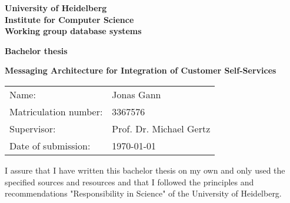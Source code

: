 \documentclass[
     12pt,         %
     a4paper,      %
     BCOR10mm,     %
     DIV14,        %
aragraph skip instad of paragraph indent
     ]{scrreprt}
\begin{document}
\listoftodos

\begin{titlepage}
     \vspace*{1cm}
     \begin{center}
          \vspace*{3cm}
          \textbf
          {
               \Large University of Heidelberg\\
               \smallskip
               \Large Institute for Computer Science\\
               \smallskip
               \Large Working group database systems\\
               \smallskip
          }

          \vspace{3cm}

          \textbf{\large Bachelor thesis}

          \vspace{0.5\baselineskip}
          {
               \huge
               \textbf{Messaging Architecture for Integration of Customer Self-Services}
          }

     \end{center}

     \vfill
     {
          \large
          \begin{tabular}[l]{ll}
               Name:                 & Jonas Gann              \\
               Matriculation number: & 3367576                 \\
               Supervisor:           & Prof. Dr. Michael Gertz \\
               Date of submission:   & \today
          \end{tabular}
     }

\end{titlepage}

\onehalfspacing

\thispagestyle{empty}

\vspace*{100pt}
\noindent
I assure that I have written this bachelor thesis on my own and only used the specified sources and
resources and that I followed the principles and recommendations "Responsibility in Science" of the
University of Heidelberg.

\vspace*{50pt}
\noindent

\underline{\phantom{mmmmmmmmmmmmmmmmmmmm}}
\end{document}

